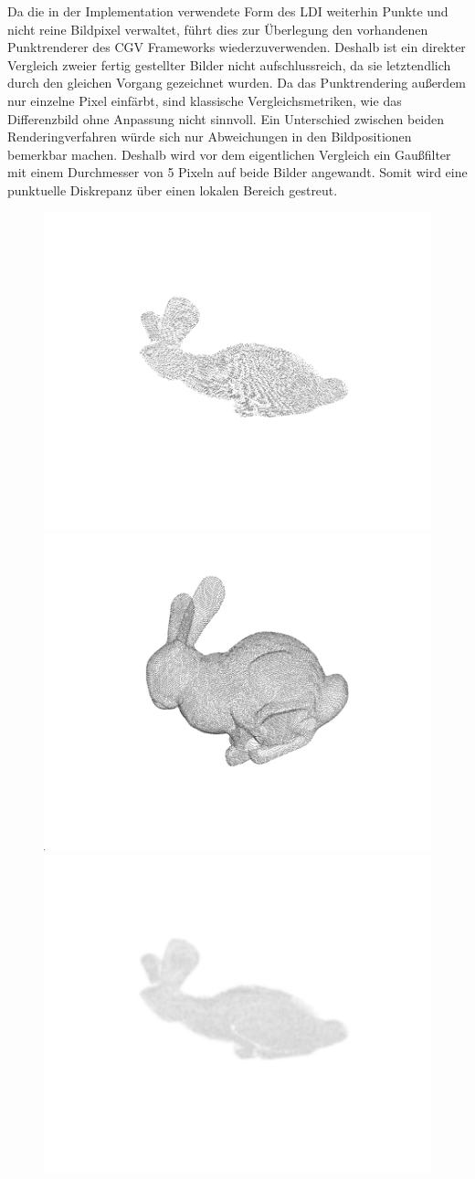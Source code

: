 \documentclass[hyperref, beleg, german]{cgvpub}
\begin{document}
Da die in der Implementation verwendete Form des LDI weiterhin Punkte und nicht
reine Bildpixel verwaltet, führt dies zur Überlegung den vorhandenen
Punktrenderer des CGV Frameworks wiederzuverwenden. Deshalb ist ein direkter
Vergleich zweier fertig gestellter Bilder nicht aufschlussreich, da sie
letztendlich durch den gleichen Vorgang gezeichnet wurden. Da das
Punktrendering außerdem nur einzelne Pixel einfärbt, sind klassische
Vergleichsmetriken, wie das Differenzbild ohne Anpassung nicht sinnvoll. Ein
Unterschied zwischen beiden Renderingverfahren würde sich nur Abweichungen in
den Bildpositionen bemerkbar machen. Deshalb wird vor dem eigentlichen
Vergleich ein Gaußfilter mit einem Durchmesser von 5 Pixeln auf beide Bilder
angewandt. Somit wird eine punktuelle Diskrepanz über einen lokalen Bereich
gestreut.

\begin{figure}
	\centering
	\includegraphics[width = .48\linewidth]{images/distortion/239}%
	\includegraphics[width = .48\linewidth]{images/distortion/241}
	\includegraphics[width = .48\linewidth]{images/distortion/239_filtered}%

\end{figure}
\end{document}
